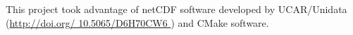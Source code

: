 This project took advantage of netCDF software developed by UCAR/Unidata (\href{http://doi.org/10.5065/D6H70CW6}{http://doi.org/ 10.5065/D6H70CW6 }) and CMake software. 